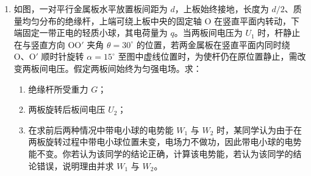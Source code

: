 \documentclass[\gkver]{gaokaozhenti}
\begin{document}
\begin{enumerate}
{$F_{N}\sin\theta=ma$，

$F_{N}\cos\theta=mg$，

联立解得 $a = g\tan\theta$。

减速时加速度向左，此加速度由斜面支持力 $F_{N}$ 与左壁支持力 $P$ 共同决定，$a > g\tan\theta$ 时

$P = 0$，

球受力如图所示，由受力分析和牛顿第二定律得


$F_{N}\sin\theta=ma$，

$F_{N}\cos\theta-Q=mg$，

解得 $Q=m(a\cot\theta-g)$。
}

\item
如图，一对平行金属板水平放置板间距为 $d$，上板始终接地，长度为 $d/2$、质量均匀分布的绝缘杆，上端可绕上板中央的固定轴 O 在竖直平面内转动，下端固定一带正电的轻质小球，其电荷量为 $q$。当两板间电压为 $U_{1}$ 时，杆静止在与竖直方向 OO$'$ 夹角 $\theta = 30^{\circ}$ 的位置，若两金属板在竖直平面内同时绕 O、O$'$ 顺时针旋转 $\alpha = 15^{\circ}$ 至图中虚线位置时，为使杆仍在原位置静止，需改变两板间电压。假定两板间始终为匀强电场。求：
\begin{enumerate}
	\item
	绝缘杆所受重力 $G$；
	\item
	两板旋转后板间电压 $U_{2}$；
	\item
	在求前后两种情况中带电小球的电势能 $W_{1}$ 与 $W_{2}$ 时，某同学认为由于在两板旋转过程中带电小球位置未变，电场力不做功，因此带电小球的电势能不变。你若认为该同学的结论正确，计算该电势能，若认为该同学的结论错误，说明理由并求 $W_{1}$ 与 $W_{2}$。
\end{enumerate}
\onepicture[align=right, h=3.60cm]{}
\end{enumerate}
\end{document}
